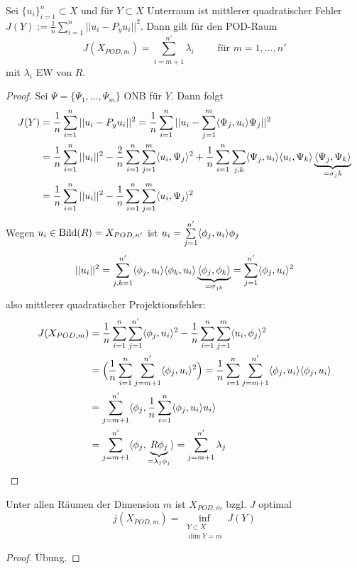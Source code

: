 \begin{satz}
Sei $\{u_i\}_{i=1}^n \subset X$ und für $Y \subset X$ Unterraum ist mittlerer quadratischer Fehler $J(Y) := \frac{1}{n} \sum\limits_{i=1}^n || u_i - P_y u_i||^2$. Dann gilt für den POD-Raum
\[
	J(X_{POD,m}) = \sum\limits_{i=m+1}^{n'} \lambda_i \qquad \text{ für } m=1,\dots,n'
\]
mit $\lambda_i$ EW von $R$.
\begin{proof}
	Sei $\Psi = \{\Psi_1,\dots,\Psi_m\}$ ONB für $Y$. Dann folgt
	\begin{align*}
		J(Y) &= \frac{1}{n} \sum\limits_{i=1}^n ||u_i - P_y u_i||^2 = \frac{1}{n} \sum\limits_{i=1}^n || u_i - \sum\limits_{j=1}^m \langle \Psi_j, u_i \rangle \Psi_j ||^2 \\
		&= \frac{1}{n} \sum\limits_{i=1}^n ||u_i||^2 - \frac{2}{n} \sum\limits_{i=1}^n \sum\limits_{j=1}^m \langle u_i, \Psi_j \rangle^2 + \frac{1}{n} \sum\limits_{i=1}^n \sum\limits_{j,k} \langle \Psi_j, u_i \rangle \langle u_i, \Psi_k \rangle \underbrace{\langle \Psi_j, \Psi_k \rangle}_{= \sigma_jk} \\
		&= \frac{1}{n} \sum\limits_{i=1}^n ||u_i||^2 - \frac{1}{n} \sum\limits_{i=1}^n \sum\limits_{j=1}^m \langle u_i, \Psi_j \rangle^2
	\end{align*}
	Wegen $u_i \in \operatorname{Bild} (R) = X_{POD,n'}$ ist $u_i = \sum\limits_{j=1}^{n'} \dotp{\phi_j}{u_i} \phi_j$
	\[ 
		||u_i||^2 = \sum\limits_{j,k=1}^{n'} \dotp{\phi_j}{u_i} \dotp{\phi_k}{u_i} \underbrace{\dotp{\phi_j}{\phi_k}}_{= \sigma_{jk}} = \sum\limits_{j=1}^{n'} \dotp{\phi_j}{u_i}^2
	\]
	also mittlerer quadratischer Projektionsfehler:
	\begin{align*}
		J(X_{POD,m}) &= \frac{1}{n} \sum\limits_{i=1}^n \sum\limits_{j=1}^{n'} \dotp{\phi_j}{u_i}^2 - \frac{1}{n} \sum\limits_{i=1}^n \sum\limits_{j=1}^m \dotp{u_i}{\phi_j}^2 \\
		&= \Big(  \frac{1}{n} \sum\limits_{i=1}^n \sum\limits_{j=m+1}^{n'} \dotp{\phi_j}{u_i}^2  \Big) = \frac{1}{n} \sum\limits_{i=1}^n \sum\limits_{j=m+1}^{n'} \dotp{\phi_j}{u_i} \dotp{\phi_j}{u_i} \\
		&= \sum\limits_{j=m+1}^{n'} \dotp{\phi_j}{\frac{1}{n} \sum\limits_{i=1}^n \dotp{\phi_j}{u_i} u_i} \\
		&= \sum\limits_{j=m+1}^{n'} \dotp{\phi_j}{\underbrace{R \phi_j}_{= \lambda_j \phi_j}} = \sum\limits_{j=m+1}^{n'} \lambda_j
	\end{align*}
\end{proof}
\end{satz}

\begin{satz}
	Unter allen Räumen der Dimension $m$ ist $X_{POD,m}$ bzgl. $J$ optimal
	\[
		j(X_{POD,m}) = \inf\limits_{\substack{Y \subset X \\ \dim Y = m}} J(Y)
	\]
	\begin{proof}
		Übung.
	\end{proof}
\end{satz}

